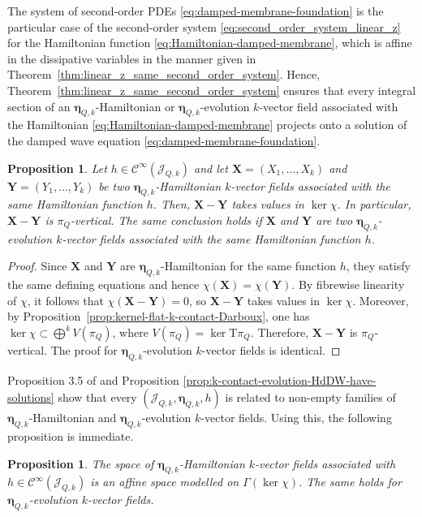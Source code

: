 \documentclass[11pt,twoside]{article}
\theoremstyle{plain}
\newtheorem{proposition}[theorem]{Proposition} \newtheorem{corollary}[theorem]{Corollary}
\theoremstyle{definition}
\theoremstyle{remark}
\newcommand{\Cinfty}{\mathscr{C}^\infty}
\newcommand{\T}{\mathrm{T}}
\begin{document}
The system of second-order PDEs \eqref{eq:damped-membrane-foundation} is the particular case of the second-order system \eqref{eq:second_order_system_linear_z} for the Hamiltonian function \eqref{eq:Hamiltonian-damped-membrane}, which is affine in the dissipative variables in the manner given in Theorem~\ref{thm:linear_z_same_second_order_system}. Hence, Theorem~\ref{thm:linear_z_same_second_order_system} ensures that every integral section of an \(\bm\eta_{Q,k}\)-Hamiltonian or \(\bm\eta_{Q,k}\)-evolution $k$-vector field associated with the Hamiltonian \eqref{eq:Hamiltonian-damped-membrane} projects onto a solution of the damped wave equation \eqref{eq:damped-membrane-foundation}.

\begin{proposition}\label{thm:difference_Hamiltonian_kernel_flat}
Let \(h\in \Cinfty(\mathcal J_{Q,k})\) and let \(\mathbf X=(X_1,\dots,X_k)\) and \(\mathbf Y=(Y_1,\dots,Y_k)\) be two \(\bm\eta_{Q,k}\)-Hamiltonian \(k\)-vector fields associated with the same Hamiltonian function \(h\). Then, \(\mathbf X-\mathbf Y\) takes values in \(\ker\chi\). In particular, \(\mathbf X-\mathbf Y\) is \(\pi_Q\)-vertical. The same conclusion holds if \(\mathbf X\) and \(\mathbf Y\) are two \(\bm\eta_{Q,k}\)-evolution $k$-vector fields associated with the same Hamiltonian function \(h\).
\end{proposition}

\begin{proof}
Since \(\mathbf X\) and \(\mathbf Y\) are \(\bm\eta_{Q,k}\)-Hamiltonian for the same function \(h\), they satisfy the same defining equations and hence \(\chi(\mathbf X)=\chi(\mathbf Y)\). By fibrewise linearity of \(\chi\), it follows that \(\chi(\mathbf X-\mathbf Y)=0\), so \(\mathbf X-\mathbf Y\) takes values in \(\ker\chi\). Moreover, by Proposition~\ref{prop:kernel-flat-k-contact-Darboux}, one has \(\ker\chi\subset\bigoplus^kV(\pi_Q)\), where \(V(\pi_Q)=\ker \T\pi_Q\). Therefore, \(\mathbf X-\mathbf Y\) is \(\pi_Q\)-vertical. The proof for \(\bm\eta_{Q,k}\)-evolution $k$-vector fields is identical.
\end{proof}

Proposition 3.5 of \cite{HLM_26} and Proposition \ref{prop:k-contact-evolution-HdDW-have-solutions} show that every $(\mathcal{J}_{Q,k},\bm \eta_{Q,k},h)$ is related to non-empty families of ${\bm \eta}_{Q,k}$-Hamiltonian and ${\bm \eta}_{Q,k}$-evolution $k$-vector fields. Using this, the following proposition is immediate. 

\begin{proposition}
The space of $\bm\eta_{Q,k}$-Hamiltonian $k$-vector fields associated with
$h\in \Cinfty(\mathcal{J}_{Q,k})$ is an affine
space modelled on $\Gamma(\ker\chi)$. The same holds for $\bm\eta_{Q,k}$-evolution
$k$-vector fields.
\end{proposition}
\end{document}

